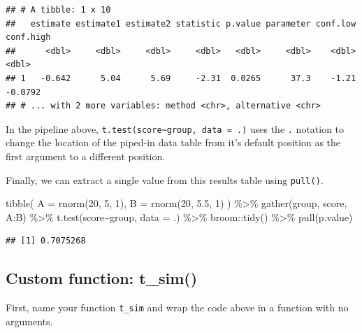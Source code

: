 \documentclass[
  oneside]{book}
\newenvironment{Shaded}{\begin{snugshade}}{\end{snugshade}}
\newcommand{\AttributeTok}[1]{\textcolor[rgb]{0.77,0.63,0.00}{#1}}
\newcommand{\DecValTok}[1]{\textcolor[rgb]{0.00,0.00,0.81}{#1}}
\newcommand{\FloatTok}[1]{\textcolor[rgb]{0.00,0.00,0.81}{#1}}
\newcommand{\FunctionTok}[1]{\textcolor[rgb]{0.00,0.00,0.00}{#1}}
\newcommand{\NormalTok}[1]{#1}
\newcommand{\SpecialCharTok}[1]{\textcolor[rgb]{0.00,0.00,0.00}{#1}}
\begin{document}
\begin{verbatim}
## # A tibble: 1 x 10
##   estimate estimate1 estimate2 statistic p.value parameter conf.low conf.high
##      <dbl>     <dbl>     <dbl>     <dbl>   <dbl>     <dbl>    <dbl>     <dbl>
## 1   -0.642      5.04      5.69     -2.31  0.0265      37.3    -1.21   -0.0792
## # ... with 2 more variables: method <chr>, alternative <chr>
\end{verbatim}

\begin{info}
In the pipeline above, \texttt{t.test(score\textasciitilde{}group,\ data\ =\ .)} uses the \texttt{.} notation to change the location of the piped-in data table from it's default position as the first argument to a different position.

\end{info}

Finally, we can extract a single value from this results table using \texttt{pull()}.

\begin{Shaded}
\begin{Highlighting}[]
\FunctionTok{tibble}\NormalTok{(}
  \AttributeTok{A =} \FunctionTok{rnorm}\NormalTok{(}\DecValTok{20}\NormalTok{, }\DecValTok{5}\NormalTok{, }\DecValTok{1}\NormalTok{),}
  \AttributeTok{B =} \FunctionTok{rnorm}\NormalTok{(}\DecValTok{20}\NormalTok{, }\FloatTok{5.5}\NormalTok{, }\DecValTok{1}\NormalTok{)}
\NormalTok{) }\SpecialCharTok{\%\textgreater{}\%}
  \FunctionTok{gather}\NormalTok{(group, score, A}\SpecialCharTok{:}\NormalTok{B) }\SpecialCharTok{\%\textgreater{}\%}
  \FunctionTok{t.test}\NormalTok{(score}\SpecialCharTok{\textasciitilde{}}\NormalTok{group, }\AttributeTok{data =}\NormalTok{ .) }\SpecialCharTok{\%\textgreater{}\%}
\NormalTok{  broom}\SpecialCharTok{::}\FunctionTok{tidy}\NormalTok{() }\SpecialCharTok{\%\textgreater{}\%}
  \FunctionTok{pull}\NormalTok{(p.value)}
\end{Highlighting}
\end{Shaded}

\begin{verbatim}
## [1] 0.7075268
\end{verbatim}

\hypertarget{custom-function-t_sim}{%
\subsection{Custom function: t\_sim()}\label{custom-function-t_sim}}

First, name your function \texttt{t\_sim} and wrap the code above in a function with no arguments.
\end{document}
